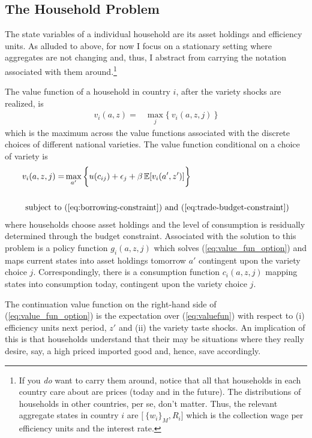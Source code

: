 \documentclass[12pt,pdftex]{article}
\begin{document}
\begin{onehalfspacing}
\subsection{The Household Problem}

The state variables of a individual household are its asset holdings and efficiency units. As alluded to above, for now I focus on a stationary setting where aggregates are not changing and, thus, I abstract from carrying the notation associated with them around.\footnote{If you \emph{do} want to carry them around, notice that all that households in each country care about are prices (today and in the future). The distributions of households in other countries, per se, don't matter. Thus, the relevant aggregate states in country $i$ are $\big [ \ \{ w_i \}_{M}, R_i \big ]$ which is the collection wage per efficiency units and the interest rate.}

The value function of a household in country $i$, after the variety shocks are realized, is
\begin{align}
v_{i}(a, z) = &  \max_{j} \big  \{ \  v_{i}(a, z, j)  \ \big \}
\label{eq:valuefun}
\end{align}
which is the maximum across the value functions associated with the discrete choices of different national varieties. The value function conditional on a choice of variety is
\begin{align}
v_{i}(a, z, j) = &  \max_{\ a' \ }\bigg  \{ u(c_{ij}) + \epsilon_{j}  + \beta \, \mathbb{E} [v_{i}(a', z')]  \bigg\}
\label{eq:value_fun_option} \\
\nonumber \\
\mbox{subject to}  \ & (\ref{eq:borrowing-constraint}) \  \mathrm{and} \ (\ref{eq:trade-budget-constraint}) \nonumber
\end{align}
where households choose asset holdings and the level of consumption is residually determined through the budget constraint. Associated with the solution to this problem is a policy function $g_{i}(a,z, j)$ which solves (\ref{eq:value_fun_option}) and maps current states into asset holdings tomorrow $a'$ contingent upon the variety choice $j$. Correspondingly, there is a consumption function $c_{i}(a,z, j)$ mapping states into consumption today, contingent upon the variety choice $j$.

The continuation value function on the right-hand side of (\ref{eq:value_fun_option}) is the expectation over (\ref{eq:valuefun}) with respect to (i) efficiency units next period, $z'$ and (ii) the variety taste shocks. An implication of this is that households understand that their may be situations where they really desire, say, a high priced imported good and, hence, save accordingly.


\end{onehalfspacing}
\end{document}
